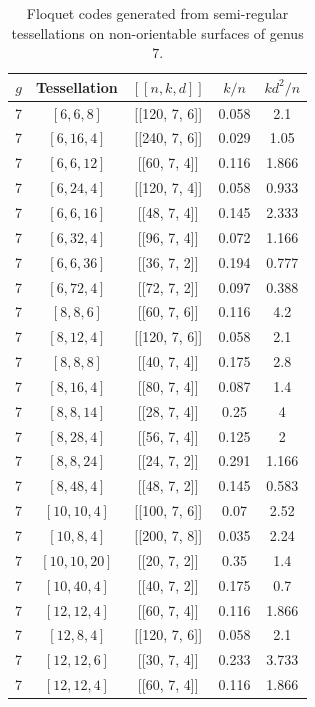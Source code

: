 \documentclass[%
reprint,
amsmath,amssymb,
aps,
]{revtex4-2}
\begin{document}
\begin{table}[b]
	\caption{\label{tab10}
		Floquet codes generated from semi-regular tessellations on non-orientable surfaces of genus $7$.}
	\begin{ruledtabular}
		\begin{tabular}{|c|c|c|c|c|}
			$g$ & Tessellation & $[[n,k,d]]$ & $k/n$ & $kd^{2}/n$ \\ \hline
	7 & $[6, 6, 8]$ & [[120,	7,	6]] &	0.058 &	2.1  \\
	7 &	$[6, 16, 4]$ & [[240,	7,	6]] & 	0.029 &	1.05  \\
	7 & $[6, 6, 12]$ & [[60,	7,	4]] & 	0.116 &	1.866  \\
	7 &	$[6, 24, 4]$ & [[120,	7,	4]] &	0.058 &	0.933 \\
	7 & $[6, 6, 16]$ & [[48,	7,	4]] &	0.145 & 2.333 \\
	7 & $[6, 32, 4]$ & [[96,	7,	4]] &	0.072 &	1.166 \\
	7 & $[6, 6, 36]$ & [[36,	7,	2]] &	0.194 &	0.777  \\
	7 & $[6, 72, 4]$ & [[72,	7,	2]] &	0.097 &	0.388  \\
	7 & $[8, 8, 6]$ & [[60,	7,	6]] &	0.116 &	4.2  \\
	7 & $[8, 12, 4]$ & [[120,	7,	6]] &	0.058 &	2.1  \\
	7 &	$[8, 8, 8]$ & [[40,	7,	4]] &	0.175 &	2.8   \\
	7 & $[8, 16, 4]$ & [[80,	7,	4]] & 	0.087 &	1.4   \\
	7 & $[8, 8, 14]$ & [[28,	7,	4]] &	0.25 &	4   \\
	7 & $[8, 28, 4]$ & [[56,	7, 	4]] &	0.125 &	2   \\
	7 &	$[8, 8, 24]$ & [[24,	7,	2]] & 	0.291 &	1.166   \\
	7 & $[8, 48, 4]$ & [[48,	7,	2]] &	0.145 &	0.583   \\
	7 &	$[10, 10, 4]$ & [[100, 7,	6]] &	0.07 &	2.52   \\
	7 &	$[10, 8, 4]$ & [[200,	7,	8]] &	0.035 &	2.24  \\
	7 & $[10, 10, 20]$ & [[20, 7,	2]] &	0.35 &	1.4   \\
	7 &	$[10, 40, 4]$ & [[40,	7,	2]] &	0.175 &	0.7  \\
	7 & $[12, 12, 4]$ & [[60,	7,	4]] &	0.116 &	1.866  \\
	7 & $[12, 8, 4]$ & [[120,	7,	6]] &	0.058 &	2.1  \\
	7 & $[12, 12, 6]$ & [[30,	7,	4]] &	0.233 &	3.733   \\
	7 & $[12, 12, 4]$ & [[60,	7,	4]] & 	0.116 &	1.866   \\

\end{tabular}
\end{ruledtabular}
\end{table}
\end{document}
